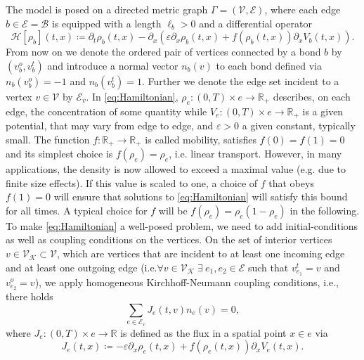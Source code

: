 The model is posed on a directed metric graph $\Gamma = (\mathcal{V}, \mathcal{E})$, where each edge $b \in \mathcal{E} = \mathcal{B}$ is equipped with a length $\ell_b > 0$ and a differential operator
\begin{equation} 
    \label{eq:Hamiltonian}
    \mathcal{H} [\rho_b] (t,x) \coloneqq \partial_t \rho_b (t,x)  - \partial_x (\varepsilon \partial_x \rho_b (t,x) + f(\rho_b (t,x) ) \partial_x V_b (t,x)).
\end{equation}
From now on we denote the ordered pair of vertices connected by a bond $b$ by $(v^{o}_b, v^{t}_b)$ and introduce a normal vector $n_b(v)$ to each bond defined via $n_b(v^{o}_b) = -1$ and $n_b(v^{t}_b) = 1$. Further we denote the edge set incident to a vertex $v \in \mathcal{V}$ by $\mathcal{E}_v$. In \cref{eq:Hamiltonian}, $\rho_e \colon (0,T) \times e \to \mathbb{R}_{+}$ describes, on each edge, the concentration of some quantity while $V_e \colon (0,T) \times e \to \mathbb{R}_{+}$ is a given potential, that may vary from edge to edge, and $\varepsilon > 0$ a given constant, typically small. The function $f \colon \mathbb{R}_{+} \to \mathbb{R}_{+}$ is called mobility, satisfies $f(0) = f(1) = 0$ and its simplest choice is $f(\rho_e) = \rho_e$, i.e. linear transport. However, in many applications, the density is now allowed to exceed a maximal value (e.g. due to finite size effects). If this value is scaled to one, a choice of $f$ that obeys $f(1) = 0$ will ensure that solutions to \eqref{eq:Hamiltonian} will satisfy this bound for all times. A typical choice for $f$ will be $f(\rho_e) = \rho_e(1-\rho_e)$ in the following. \\
To make \cref{eq:Hamiltonian} a well-posed problem, we need to add initial-conditions as well as coupling conditions on the vertices. On the set of interior vertices $v \in \mathcal{V}_\mathcal{K} \subset \mathcal{V}$, which are vertices that are incident to at least one incoming edge and at least one outgoing edge (i.e.$\forall v \in \mathcal{V}_\mathcal{K} \; \exists \ e_1, e_2 \in \mathcal{E}$ such that $v^{t}_{e_1} = v$ and $v^{o}_{e_2} = v$), we apply homogeneous Kirchhoff-Neumann coupling conditions, i.e., there holds
\begin{equation}
    \label{eq:Kirchhoff_Neumann_condition}
    \sum_{e\in \mathcal{E}_v} J_e(t,v) n_e (v)=0,
\end{equation}
where $J_e \colon (0,T) \times e \to \mathbb{R}$ is defined as the flux in a spatial point $x \in e$ via 
\begin{equation} 
    \label{eq:flux} 
    J_e(t,x) \coloneqq - \varepsilon \partial_x \rho_e (t, x) + f(\rho_e(t, x)) \partial_x V_e(t, x).
\end{equation}
